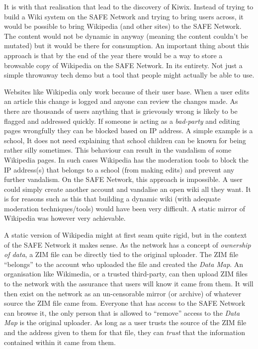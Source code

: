 It is with that realisation that lead to the discovery of Kiwix. Instead of trying to build a Wiki system on the SAFE Network and trying to bring users across, it would be possible to bring Wikipedia (and other sites) to the SAFE Network. The content would not be dynamic in anyway (meaning the content couldn't be mutated) but it would be there for consumption. An important thing about this approach is that by the end of the year there would be a way to store a browsable copy of Wikipedia on the SAFE Network. In its entirety. Not just a simple throwaway tech demo but a tool that people might actually be able to use.

Websites like Wikipedia only work because of their user base. When a user edits an article this change is logged and anyone can review the changes made. As there are thousands of users anything that is grievously wrong is likely to be flagged and addressed quickly. If someone is acting as a \textit{bad-party} and editing pages wrongfully they can be blocked based on IP address. A simple example is a school, It does not need explaining that school children can be known for being rather silly sometimes. This behaviour can result in the vandalism of some Wikipedia pages. In such cases Wikipedia has the moderation tools to block the IP address(s) that belongs to a school (from making edits) and prevent any further vandalism. On the SAFE Network, this approach is impossible. A user could simply create another account and vandalise an open wiki all they want. It is for reasons such as this that building a dynamic wiki (with adequate moderation techniques/tools) would have been very difficult. A static mirror of Wikipedia was however very achievable.

A static version of Wikipedia might at first seam quite rigid, but in the context of the SAFE Network it makes sense. As the network has a concept of \textit{ownership of data}, a ZIM file can be directly tied to the original uploader. The ZIM file ``belongs'' to the account who uploaded the file and created the \textit{Data Map}. An organisation like Wikimedia, or a trusted third-party, can then upload ZIM files to the network with the assurance that users will know it came from them. It will then exist on the network as an un-censorable mirror (or archive) of whatever source the ZIM file came from. Everyone that has access to the SAFE Network can browse it, the only person that is allowed to ``remove'' access to the \textit{Data Map} is the original uploader. As long as a user trusts the source of the ZIM file and the address given to them for that file, they can \textit{trust} that the information contained within it came from them.

